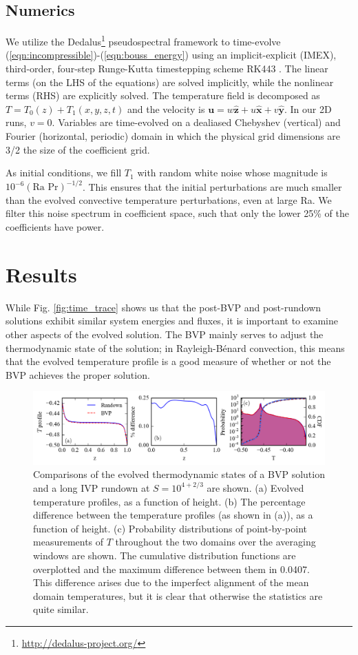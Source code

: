 \documentclass[aps, pre, onecolumn, nofootinbib, notitlepage, groupedaddress, amsfonts, amssymb, amsmath, longbibliography]{revtex4-1}
\newcommand{\RB}{Rayleigh-B\'{e}nard }
\begin{document}
\subsection{Numerics}
We utilize the 
Dedalus\footnote{\url{http://dedalus-project.org/}} 
pseudospectral framework \cite{burns&all2016} to time-evolve  
(\ref{eqn:incompressible})-(\ref{eqn:bouss_energy}) 
using an implicit-explicit (IMEX), third-order, four-step 
Runge-Kutta timestepping scheme RK443 \cite{ascher&all1997}.  
The linear terms (on the LHS of the equations) are solved implicitly,
while the nonlinear terms (RHS) are explicitly solved.
The temperature field is decomposed as $T = T_0(z) + T_1(x, y, z, t)$
and the velocity is $\bm{u} = w\bm{\hat{z}} + u\bm{\hat{x}} + v\bm{\hat{y}}$.
In our 2D runs, $v = 0$.
Variables are time-evolved on a dealiased Chebyshev (vertical)
and Fourier (horizontal, periodic) domain in which the
physical grid dimensions are 3/2 the size of the coefficient grid.  

As initial conditions, we fill $T_1$ with
random white noise whose magnitude is $10^{-6}(\text{Ra Pr})^{-1/2}$.
This ensures that the initial perturbations are much smaller than the
evolved convective temperature perturbations, even at large Ra.
We filter this noise spectrum in coefficient space, 
such that only the lower 25\% of the coefficients
have power.

\section{Results}
\label{sec:results}
While Fig. \ref{fig:time_trace} shows us that the post-BVP and post-rundown solutions
exhibit similar system energies and fluxes, it is important to examine other aspects of
the evolved solution. The BVP mainly serves to adjust the thermodynamic state of the solution;
in \RB convection, this means that the evolved temperature profile is a good measure of whether
or not the BVP achieves the proper solution.

\begin{figure}[t]
\includegraphics[width=\textwidth]{./figs/temp_comparison.png}
\caption{Comparisons of the evolved thermodynamic states of a BVP solution and a long IVP rundown at
$S = 10^{4 + 2/3}$ are shown.  (a) Evolved temperature profiles, as a function of height.
(b) The percentage difference between the temperature profiles (as shown in (a)), as a function of height.
(c) Probability distributions of point-by-point measurements of $T$ throughout the two domains over the
averaging windows are shown.  The cumulative distribution functions are overplotted and the maximum
difference between them in 0.0407. This difference arises due to the imperfect alignment of the
mean domain temperatures, but it is clear that otherwise the statistics are quite similar.
\label{fig:temp_comparison} }
\end{figure}
\end{document}
